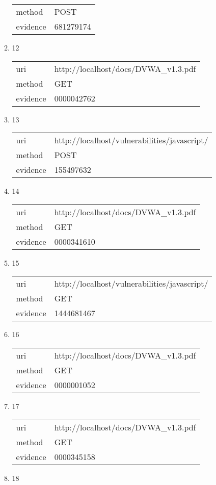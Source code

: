 \documentclass[10pt]{article}
\begin{document}
\begin{itemize}
\begin{enumerate}
\begin{tabular}{| l | p{14cm}}
method & POST \\
evidence & 681279174 \\
\end{tabular}
\item[] 12
\begin{tabular}{| l | p{14cm}}
uri & http://localhost/docs/DVWA{\_}v1.3.pdf \\
method & GET \\
evidence & 0000042762 \\
\end{tabular}
\item[] 13
\begin{tabular}{| l | p{14cm}}
uri & http://localhost/vulnerabilities/javascript/ \\
method & POST \\
evidence & 155497632 \\
\end{tabular}
\item[] 14
\begin{tabular}{| l | p{14cm}}
uri & http://localhost/docs/DVWA{\_}v1.3.pdf \\
method & GET \\
evidence & 0000341610 \\
\end{tabular}
\item[] 15
\begin{tabular}{| l | p{14cm}}
uri & http://localhost/vulnerabilities/javascript/ \\
method & GET \\
evidence & 1444681467 \\
\end{tabular}
\item[] 16
\begin{tabular}{| l | p{14cm}}
uri & http://localhost/docs/DVWA{\_}v1.3.pdf \\
method & GET \\
evidence & 0000001052 \\
\end{tabular}
\item[] 17
\begin{tabular}{| l | p{14cm}}
uri & http://localhost/docs/DVWA{\_}v1.3.pdf \\
method & GET \\
evidence & 0000345158 \\
\end{tabular}
\item[] 18
\begin{tabular}{| l | p{14cm}}

\end{tabular}
\end{enumerate}
\end{itemize}
\end{document}
